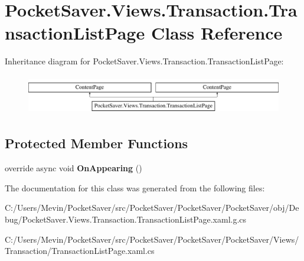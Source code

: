 \hypertarget{class_pocket_saver_1_1_views_1_1_transaction_1_1_transaction_list_page}{}\section{Pocket\+Saver.\+Views.\+Transaction.\+Transaction\+List\+Page Class Reference}
\label{class_pocket_saver_1_1_views_1_1_transaction_1_1_transaction_list_page}
Inheritance diagram for Pocket\+Saver.\+Views.\+Transaction.\+Transaction\+List\+Page\+:\begin{figure}[H]
\begin{center}
\leavevmode
\includegraphics[height=1.761006cm]{class_pocket_saver_1_1_views_1_1_transaction_1_1_transaction_list_page}
\end{center}
\end{figure}
\subsection*{Protected Member Functions}
\begin{DoxyCompactItemize}
\item 
\mbox{\label{class_pocket_saver_1_1_views_1_1_transaction_1_1_transaction_list_page_a8af1a929634ca8eb26dadd56d6d02fc4}} 
override async void {\bfseries On\+Appearing} ()
\end{DoxyCompactItemize}


The documentation for this class was generated from the following files\+:\begin{DoxyCompactItemize}
\item 
C\+:/\+Users/\+Mevin/\+Pocket\+Saver/src/\+Pocket\+Saver/\+Pocket\+Saver/\+Pocket\+Saver/obj/\+Debug/Pocket\+Saver.\+Views.\+Transaction.\+Transaction\+List\+Page.\+xaml.\+g.\+cs\item 
C\+:/\+Users/\+Mevin/\+Pocket\+Saver/src/\+Pocket\+Saver/\+Pocket\+Saver/\+Pocket\+Saver/\+Views/\+Transaction/Transaction\+List\+Page.\+xaml.\+cs\end{DoxyCompactItemize}
